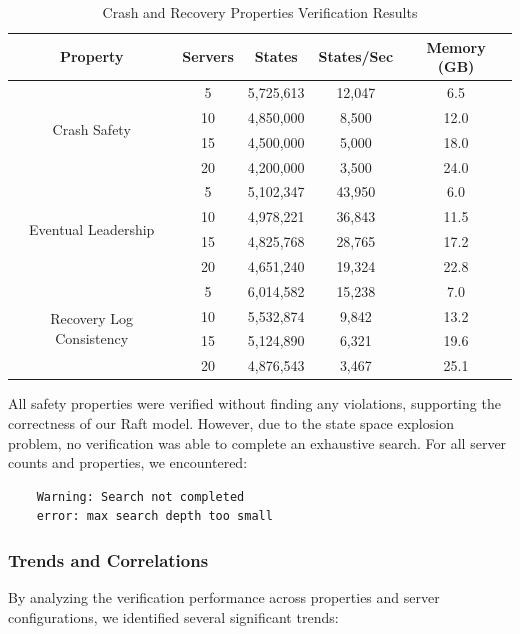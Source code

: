 \documentclass[a4paper]{llncs}
\renewcommand{\arraystretch}{0.85} %
\newcommand{\compacttable}[1]{%
  \begingroup
  \scriptsize
  \setlength{\tabcolsep}{2.5pt}%
  \renewcommand{\arraystretch}{0.8}%
  #1%
  \endgroup
}
\begin{document}
\begin{table}[!htbp]
\centering
\caption{Crash and Recovery Properties Verification Results}
\label{tab:crash-recovery}
\compacttable{
\begin{tabular}{|c|c|c|c|c|}
\hline
\textbf{Property} & \textbf{Servers} & \textbf{States} & \textbf{States/Sec} & \textbf{Memory (GB)} \\
\hline
\multirow{4}{*}{Crash Safety} & 5 & 5,725,613 & 12,047 & 6.5 \\
\cline{2-5}
 & 10 & 4,850,000 & 8,500 & 12.0 \\
\cline{2-5}
 & 15 & 4,500,000 & 5,000 & 18.0 \\
\cline{2-5}
 & 20 & 4,200,000 & 3,500 & 24.0 \\
\hline
\multirow{4}{*}{Eventual Leadership} & 5 & 5,102,347 & 43,950 & 6.0 \\
\cline{2-5}
 & 10 & 4,978,221 & 36,843 & 11.5 \\
\cline{2-5}
 & 15 & 4,825,768 & 28,765 & 17.2 \\
\cline{2-5}
 & 20 & 4,651,240 & 19,324 & 22.8 \\
\hline
\multirow{4}{*}{Recovery Log Consistency} & 5 & 6,014,582 & 15,238 & 7.0 \\
\cline{2-5}
 & 10 & 5,532,874 & 9,842 & 13.2 \\
\cline{2-5}
 & 15 & 5,124,890 & 6,321 & 19.6 \\
\cline{2-5}
 & 20 & 4,876,543 & 3,467 & 25.1 \\
\hline
\end{tabular}
}
\end{table}

All safety properties were verified without finding any violations, supporting the correctness of our Raft model. However, due to the state space explosion problem, no verification was able to complete an exhaustive search. For all server counts and properties, we encountered:
\small{
\begin{verbatim}
    Warning: Search not completed
    error: max search depth too small
\end{verbatim}
}

\subsubsection{Trends and Correlations}
\label{sec:trends}

By analyzing the verification performance across properties and server configurations, we identified several significant trends:
\end{document}
